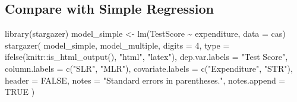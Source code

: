 \documentclass[
  12pt,
  a4paper,
]{scrbook}
\newenvironment{Shaded}{\begin{snugshade}}{\end{snugshade}}
\newcommand{\AttributeTok}[1]{\textcolor[rgb]{0.40,0.45,0.13}{#1}}
\newcommand{\ConstantTok}[1]{\textcolor[rgb]{0.56,0.35,0.01}{#1}}
\newcommand{\DecValTok}[1]{\textcolor[rgb]{0.68,0.00,0.00}{#1}}
\newcommand{\FunctionTok}[1]{\textcolor[rgb]{0.28,0.35,0.67}{#1}}
\newcommand{\NormalTok}[1]{\textcolor[rgb]{0.00,0.23,0.31}{#1}}
\newcommand{\OtherTok}[1]{\textcolor[rgb]{0.00,0.23,0.31}{#1}}
\newcommand{\SpecialCharTok}[1]{\textcolor[rgb]{0.37,0.37,0.37}{#1}}
\newcommand{\StringTok}[1]{\textcolor[rgb]{0.13,0.47,0.30}{#1}}
\theoremstyle{plain}
\theoremstyle{definition}
\theoremstyle{remark}
\begin{document}
\subsection{Compare with Simple
Regression}\label{compare-with-simple-regression}

\begin{Shaded}
\begin{Highlighting}[]
\FunctionTok{library}\NormalTok{(stargazer)}
\NormalTok{model\_simple }\OtherTok{\textless{}{-}} \FunctionTok{lm}\NormalTok{(TestScore }\SpecialCharTok{\textasciitilde{}}\NormalTok{ expenditure, }\AttributeTok{data =}\NormalTok{ cas)}
\FunctionTok{stargazer}\NormalTok{(}
\NormalTok{    model\_simple, model\_multiple,}
    \AttributeTok{digits =} \DecValTok{4}\NormalTok{,}
    \AttributeTok{type =} \FunctionTok{ifelse}\NormalTok{(knitr}\SpecialCharTok{::}\FunctionTok{is\_html\_output}\NormalTok{(), }\StringTok{"html"}\NormalTok{, }\StringTok{"latex"}\NormalTok{),}
    \AttributeTok{dep.var.labels =} \StringTok{"Test Score"}\NormalTok{,}
    \AttributeTok{column.labels =} \FunctionTok{c}\NormalTok{(}\StringTok{"SLR"}\NormalTok{, }\StringTok{"MLR"}\NormalTok{),}
    \AttributeTok{covariate.labels =} \FunctionTok{c}\NormalTok{(}\StringTok{"Expenditure"}\NormalTok{, }\StringTok{"STR"}\NormalTok{),}
    \AttributeTok{header =} \ConstantTok{FALSE}\NormalTok{,}
    \AttributeTok{notes =} \StringTok{"Standard errors in parentheses."}\NormalTok{,}
    \AttributeTok{notes.append =} \ConstantTok{TRUE}
\NormalTok{)}
\end{Highlighting}
\end{Shaded}
\end{document}
